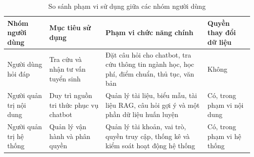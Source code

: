 \begin{table}[H]
    \centering
    \caption{So sánh phạm vi sử dụng giữa các nhóm người dùng}
    \small
    \begin{tabularx}{\textwidth}{|p{3cm}|p{3cm}|X|p{2.5cm}|}
        \hline
        \textbf{Nhóm người dùng} & \textbf{Mục tiêu sử dụng} & \textbf{Phạm vi chức năng chính} & \textbf{Quyền thay đổi dữ liệu} \\ \hline
        Người dùng hỏi đáp & Tra cứu và nhận tư vấn tuyển sinh & Đặt câu hỏi cho chatbot, tra cứu thông tin ngành học, học phí, điểm chuẩn, thủ tục, văn bản & Không \\ \hline
        Người quản trị nội dung & Duy trì nguồn tri thức phục vụ chatbot & Quản lý tài liệu, biểu mẫu, tài liệu RAG, câu hỏi gợi ý và một phần dữ liệu huấn luyện & Có, trong phạm vi nội dung \\ \hline
        Người quản trị hệ thống & Quản lý vận hành và phân quyền & Quản lý tài khoản, vai trò, quyền truy cập, thống kê và kiểm soát hoạt động hệ thống & Có, trong phạm vi hệ thống \\ \hline
    \end{tabularx}
\end{table}
